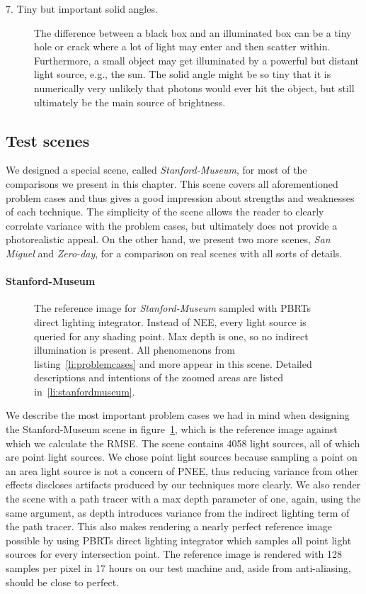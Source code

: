 \begin{description}
    \item[7. Tiny but important solid angles.] The difference between a black box and an illuminated box can be a tiny hole or crack where a lot of light may enter and then scatter within. Furthermore, a small object may get illuminated by a powerful but distant light source, e.g., the sun. The solid angle might be so tiny that it is numerically very unlikely that photons would ever hit the object, but still ultimately be the main source of brightness.
\label{li:problemcases}
\end{description} 

\subsection{Test scenes}

We designed a special scene, called \textit{Stanford-Museum}, for most of the comparisons we present in this chapter. This scene covers all aforementioned problem cases and thus gives a good impression about strengths and weaknesses of each technique. The simplicity of the scene allows the reader to clearly correlate variance with the problem cases, but ultimately does not provide a photorealistic appeal. On the other hand, we present two more scenes, \textit{San Miguel} and \textit{Zero-day}, for a comparison on real scenes with all sorts of details.

\paragraph{Stanford-Museum}
\label{sec:stanfordmuseum}
\begin{figure}[ht]\centering

\caption{The reference image for \textit{Stanford-Museum} sampled with PBRTs direct lighting integrator. Instead of NEE, every light source is queried for any shading point. Max depth is one, so no indirect illumination is present. All phenomenons from listing~\ref{li:problemcases} and more appear in this scene. Detailed descriptions and intentions of the zoomed areas are listed in~\ref{li:stanfordmuseum}.
}
\label{fig:stanfordmuseumref}
\end{figure}

We describe the most important problem cases we had in mind when designing the Stanford-Museum scene in figure~\ref{fig:stanfordmuseumref}, which is the reference image against which we calculate the RMSE. The scene contains 4058 light sources, all of which are point light sources. We chose point light sources because sampling a point on an area light source is not a concern of PNEE, thus reducing variance from other effects discloses artifacts produced by our techniques more clearly. We also render the scene with a path tracer with a max depth parameter of one, again, using the same argument, as depth introduces variance from the indirect lighting term of the path tracer. This also makes rendering a nearly perfect reference image possible by using PBRTs direct lighting integrator which samples all point light sources for every intersection point. The reference image is rendered with 128 samples per pixel in 17 hours on our test machine and, aside from anti-aliasing, should be close to perfect. 

